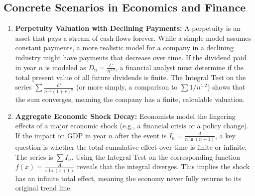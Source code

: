 \documentclass{article}
\begin{document}
\subsection{Concrete Scenarios in Economics and Finance}
\begin{enumerate}
    \item \textbf{Perpetuity Valuation with Declining Payments:} A perpetuity is an asset that pays a stream of cash flows forever. While a simple model assumes constant payments, a more realistic model for a company in a declining industry might have payments that decrease over time. If the dividend paid in year $n$ is modeled as $D_n = \frac{C}{n^{1.2}}$, a financial analyst must determine if the total present value of all future dividends is finite. The Integral Test on the series $\sum \frac{C}{n^{1.2}(1+r)^n}$ (or more simply, a comparison to $\sum 1/n^{1.2}$) shows that the sum converges, meaning the company has a finite, calculable valuation.

    \item \textbf{Aggregate Economic Shock Decay:} Economists model the lingering effects of a major economic shock (e.g., a financial crisis or a policy change). If the impact on GDP in year $n$ after the event is $I_n = \frac{A}{n \ln(n+1)}$, a key question is whether the total cumulative effect over time is finite or infinite. The series is $\sum I_n$. Using the Integral Test on the corresponding function $f(x) = \frac{A}{x \ln(x+1)}$ reveals that the integral diverges. This implies the shock has an infinite total effect, meaning the economy never fully returns to its original trend line.
\end{enumerate}
\end{document}
